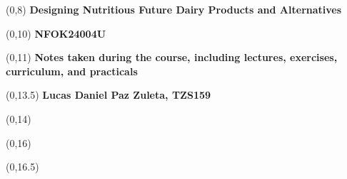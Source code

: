 \begin{titlepage}

    
    \begin{textblock}{9.4}(0,8)
        \Huge{\selectfont\bfseries{Designing Nutritious Future Dairy Products and Alternatives}}
    \end{textblock}
    \begin{textblock}{9.4}(0,10)
        \Huge{\selectfont\bfseries{NFOK24004U}}
    \end{textblock}
    
    \begin{textblock}{9.4}(0,11)
        \LARGE{\selectfont\bfseries{Notes taken during the course, including lectures, exercises, curriculum, and practicals}}
    \end{textblock}
    
    \begin{textblock}{9.4}(0,13.5)
        \large{\selectfont\bfseries{
        Lucas Daniel Paz Zuleta, TZS159}}
    \end{textblock}
    
    \begin{textblock}{9.4}(0,14)
        \large{\selectfont{MSc student at the University of Copenhagen}}
    \end{textblock}
    
    \begin{textblock}{9.4}(0,16)
        \large{\selectfont{Last compiled: \today}}
    \end{textblock}
    
    \begin{textblock}{8.4}(0,16.5)
        \large{}
    \end{textblock}
    

\end{titlepage}
